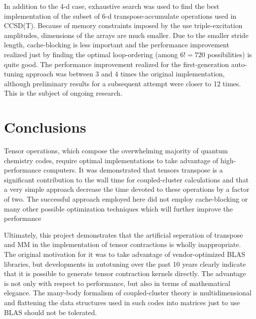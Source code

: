 \documentclass[aps,preprint,groupedaddress]{revtex4-1}
\begin{document}
In addition to the 4-d case, exhaustive search was used to find the best implementation of the subset of 6-d transpose-accumulate operations used in CCSD(T).  Because of memory constraints imposed by the use triple-excitation amplitudes, dimensions of the arrays are much smaller.  Due to the smaller stride length, cache-blocking is less important and the performance improvement realized just by finding the optimal loop-ordering (among $6!=720$ possibilities) is quite good.  The performance improvement realized for the first-generation auto-tuning approach was between 3 and 4 times the original implementation, although preliminary results for a subsequent attempt were closer to 12 times.  This is the subject of ongoing research.

\section{Conclusions}

Tensor operations, which compose the overwhelming majority of quantum chemistry codes, require optimal implementations to take advantage of high-performance computers.  It was demonstrated that tensors transpose is a significant contribution to the wall time for coupled-cluster calculations and that a very simple approach decrease the time devoted to these operations by a factor of two.  The successful approach employed here did not employ cache-blocking or many other possible optimization techniques which will further improve the performance

Ultimately, this project demonstrates that the artificial seperation of transpose and MM in the implementation of tensor contractions is wholly inappropriate.  The original motivation for it was to take advantage of vendor-optimized BLAS libraries, but developments in autotuning over the past 10 years clearly indicate that it is possible to generate tensor contraction kernels directly.  The advantage is not only with respect to performance, but also in terms of mathematical elegance.  The many-body formalism of coupled-cluster theory is multidimensional and flattening the data structures used in such codes into matrices just to use BLAS should not be tolerated.
\end{document}
